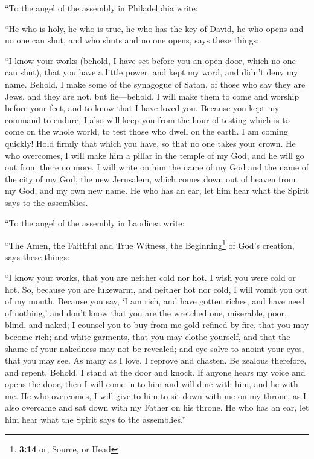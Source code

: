  ``To the angel of the assembly in Philadelphia write:

``He who is holy, he who is true, he who has the key of David, he who
opens and no one can shut, and who shuts and no one opens, says these
things:

 ``I know your works (behold, I have set before you an
open door, which no one can shut), that you have a little power, and
kept my word, and didn't deny my name.  Behold, I make
some of the synagogue of Satan, of those who say they are Jews, and they
are not, but lie---behold, I will make them to come and worship before
your feet, and to know that I have loved you.  Because
you kept my command to endure, I also will keep you from the hour of
testing which is to come on the whole world, to test those who dwell on
the earth.  I am coming quickly! Hold firmly that which
you have, so that no one takes your crown.  He who
overcomes, I will make him a pillar in the temple of my God, and he will
go out from there no more. I will write on him the name of my God and
the name of the city of my God, the new Jerusalem, which comes down out
of heaven from my God, and my own new name.  He who has
an ear, let him hear what the Spirit says to the assemblies.

 ``To the angel of the assembly in Laodicea write:

``The Amen, the Faithful and True Witness, the Beginning\footnote{\textbf{3:14}
  or, Source, or Head} of God's creation, says these things:

 ``I know your works, that you are neither cold nor hot.
I wish you were cold or hot.  So, because you are
lukewarm, and neither hot nor cold, I will vomit you out of my mouth.
 Because you say, `I am rich, and have gotten riches, and
have need of nothing,' and don't know that you are the wretched one,
miserable, poor, blind, and naked;  I counsel you to buy
from me gold refined by fire, that you may become rich; and white
garments, that you may clothe yourself, and that the shame of your
nakedness may not be revealed; and eye salve to anoint your eyes, that
you may see.  As many as I love, I reprove and chasten.
Be zealous therefore, and repent.  Behold, I stand at the
door and knock. If anyone hears my voice and opens the door, then I will
come in to him and will dine with him, and he with me. 
He who overcomes, I will give to him to sit down with me on my throne,
as I also overcame and sat down with my Father on his throne.
 He who has an ear, let him hear what the Spirit says to
the assemblies.''

